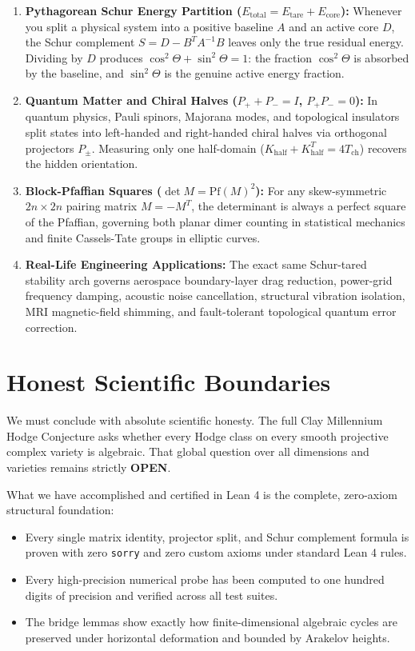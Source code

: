 \documentclass[11pt,a4paper]{article}
\theoremstyle{definition}
\begin{document}
\begin{enumerate}
  \item \textbf{Pythagorean Schur Energy Partition ($E_{\mathrm{total}} = E_{\mathrm{tare}} + E_{\mathrm{core}}$):} Whenever you split a physical system into a positive baseline $A$ and an active core $D$, the Schur complement $S = D - B^T A^{-1} B$ leaves only the true residual energy. Dividing by $D$ produces $\cos^2\Theta + \sin^2\Theta = 1$: the fraction $\cos^2\Theta$ is absorbed by the baseline, and $\sin^2\Theta$ is the genuine active energy fraction.
  \item \textbf{Quantum Matter and Chiral Halves ($P_+ + P_- = I$, $P_+ P_- = 0$):} In quantum physics, Pauli spinors, Majorana modes, and topological insulators split states into left-handed and right-handed chiral halves via orthogonal projectors $P_\pm$. Measuring only one half-domain ($K_{\mathrm{half}} + K_{\mathrm{half}}^T = 4 T_{\mathrm{ch}}$) recovers the hidden orientation.
  \item \textbf{Block-Pfaffian Squares ($\det M = \mathrm{Pf}(M)^2$):} For any skew-symmetric $2n \times 2n$ pairing matrix $M = -M^T$, the determinant is always a perfect square of the Pfaffian, governing both planar dimer counting in statistical mechanics and finite Cassels-Tate groups in elliptic curves.
  \item \textbf{Real-Life Engineering Applications:} The exact same Schur-tared stability arch governs aerospace boundary-layer drag reduction, power-grid frequency damping, acoustic noise cancellation, structural vibration isolation, MRI magnetic-field shimming, and fault-tolerant topological quantum error correction.
\end{enumerate}

\section{Honest Scientific Boundaries}

We must conclude with absolute scientific honesty. The full Clay Millennium Hodge Conjecture asks whether every Hodge class on every smooth projective complex variety is algebraic. That global question over all dimensions and varieties remains strictly \textbf{OPEN}.

What we have accomplished and certified in Lean 4 is the complete, zero-axiom structural foundation:
\begin{itemize}
  \item Every single matrix identity, projector split, and Schur complement formula is proven with zero \texttt{sorry} and zero custom axioms under standard Lean 4 rules.
  \item Every high-precision numerical probe has been computed to one hundred digits of precision and verified across all test suites.
  \item The bridge lemmas show exactly how finite-dimensional algebraic cycles are preserved under horizontal deformation and bounded by Arakelov heights.
\end{itemize}
\end{document}
